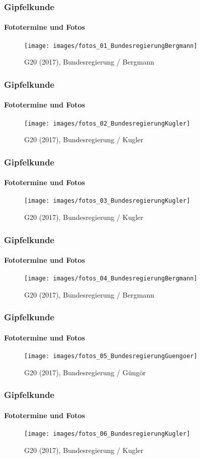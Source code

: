 \documentclass[]{beamer}
\begin{document}
	\begin{frame}
	\frametitle{Gipfelkunde}  \framesubtitle{Fototermine und Fotos}
	\begin{figure}[h!]
		\renewcommand{\figurename}{Foto} 
		\texttt{[image: images/fotos\_01\_BundesregierungBergmann]}
		\caption{G20 (2017), Bundesregierung / Bergmann}
	\end{figure}
	\end{frame}

	\begin{frame}
	\frametitle{Gipfelkunde}  \framesubtitle{Fototermine und Fotos}
	\begin{figure}[h!]
		\renewcommand{\figurename}{Foto} 
		\texttt{[image: images/fotos\_02\_BundesregierungKugler]}
		\caption{G20 (2017), Bundesregierung / Kugler}
	\end{figure}
	\end{frame}

	\begin{frame}
	\frametitle{Gipfelkunde}  \framesubtitle{Fototermine und Fotos}
	\begin{figure}[h!]
		\renewcommand{\figurename}{Foto} 
		\texttt{[image: images/fotos\_03\_BundesregierungKugler]}
		\caption{G20 (2017), Bundesregierung / Kugler}
	\end{figure}
	\end{frame}

	\begin{frame}
	\frametitle{Gipfelkunde}  \framesubtitle{Fototermine und Fotos}	
	\begin{figure}[h!]
		\renewcommand{\figurename}{Foto} 
		\texttt{[image: images/fotos\_04\_BundesregierungBergmann]}
		\caption{G20 (2017), Bundesregierung / Bergmann}
	\end{figure}
	\end{frame}

	\begin{frame}
	\frametitle{Gipfelkunde}  \framesubtitle{Fototermine und Fotos}
	\begin{figure}[h!]
		\renewcommand{\figurename}{Foto} 
		\texttt{[image: images/fotos\_05\_BundesregierungGuengoer]}
		\caption{G20 (2017), Bundesregierung / Güngör}
	\end{figure}
	\end{frame}

	\begin{frame}
	\frametitle{Gipfelkunde}  \framesubtitle{Fototermine und Fotos}
	\begin{figure}[h!]
		\renewcommand{\figurename}{Foto} 
		\texttt{[image: images/fotos\_06\_BundesregierungKugler]}
		\caption{G20 (2017), Bundesregierung / Kugler}
	\end{figure}
	\end{frame}
\end{document}
